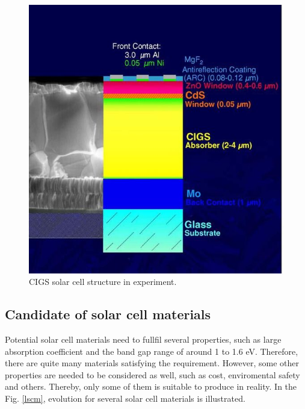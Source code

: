 \documentclass[a4paper, 12pt, titlepage,oneside,drop]{kthesis}
\begin{document}
\begin{figure}[H]
\centering
\includegraphics[scale=.5]{CIGS_Structure.JPG}
\caption{CIGS solar cell structure in experiment.}
\label{cigs_cells}
\end{figure}





\subsection{Candidate of solar cell materials}


Potential solar cell materials need to fullfil several properties, such as large absorption coefficient and the band gap range of around 1 to 1.6 eV. Therefore, there 
are quite many materials satisfying the requirement. However, some other properties are needed to be considered as well, such as cost, enviromental safety
and others. Thereby, only some of them is suitable to produce in reality. In the Fig. \ref{lscm}, evolution for several solar cell materials is illustrated. 
\end{document}
